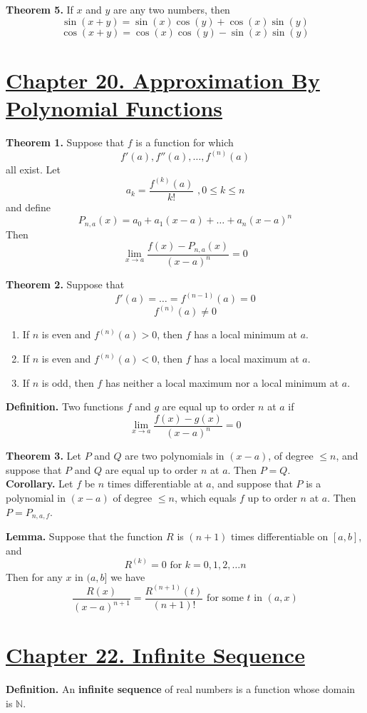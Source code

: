 \documentclass[10pt,letterpaper]{article}
\begin{document}
	\textbf{Theorem 5. } If $x$ and $y$ are any two numbers, then
	$$\sin(x + y) = \sin(x) \cos(y) + \cos(x) \sin(y)$$
	$$\cos(x + y) = \cos(x) \cos(y) - \sin(x) \sin(y)$$
	
	
	\section*{{\color{red}\underline{Chapter 20. Approximation By Polynomial Functions}}}
	\textbf{Theorem 1.} Suppose that $f$ is a function for which 
	$$f'(a), f''(a), \ldots, f^{(n)}(a)$$
	all exist. Let
	$$a_k = \dfrac{f^{(k)}(a)}{k!}  \, \, ,0 \leq k \leq n$$
	and define
	$$P_{n,a}(x) = a_0 + a_1(x - a) + \ldots + a_n(x - a)^n$$
	Then
	$$\displaystyle\lim_{x\to a} \dfrac{f(x) - P_{n,a}(x)}{(x - a)^n} = 0$$
	
	\textbf{Theorem 2. } Suppose that 
	$$f'(a) = \ldots = f^{(n-1)}(a) = 0$$
	$$f^{(n)}(a) \neq 0$$
	\begin{enumerate}[(1)]
	\item If $n$ is even and $f^{(n)}(a) > 0$, then $f$ has a local minimum at $a$.
	\item If $n$ is even and $f^{(n)}(a) < 0$, then $f$ has a local maximum at $a$.
	\item If $n$ is odd, then $f$ has neither a local maximum nor a local minimum at $a$.
	\end{enumerate}		
	
	\textbf{Definition. } 
	Two functions $f$ and $g$ are equal up to order $n$ at $a$ if 
	$$\displaystyle\lim_{x\to a}\dfrac{f(x) - g(x)}{(x - a)^n} = 0$$
	
	\textbf{Theorem 3. }
	Let $P$ and $Q$ are two polynomials in $(x - a)$, of degree $\leq n$, and suppose that
	$P$ and $Q$ are equal up to order $n$ at $a$. Then $P = Q$. \\
	
	\textbf{Corollary. } 
	Let $f$ be $n$ times differentiable at $a$, and suppose that $P$ is a polynomial in $(x - a)$
	of degree $\leq n$, which equals $f$ up to order $n$ at $a$. Then $P = P_{n,a,f}$.
	
	\textbf{Lemma. } 
	Suppose that the function $R$ is $(n + 1)$ times differentiable on $[a, b]$, and 
	$$R^{(k)} = 0 \text{ for } k = 0, 1, 2, \ldots n$$
	Then for any $x$ in $(a, b]$ we have
	$$
	\dfrac{R(x)}{(x - a)^{n+1}} = \dfrac{R^{(n+1)}(t)}{(n + 1)!} \text{ for some } t \text{ in } (a, x)$$
	
	
	\section*{{\color{red}\underline{Chapter 22. Infinite Sequence}}}
	\textbf{Definition. } An \textbf{infinite sequence} of real numbers is a function 
	whose domain is $\mathbb{N}$. \\
	
\end{document}
